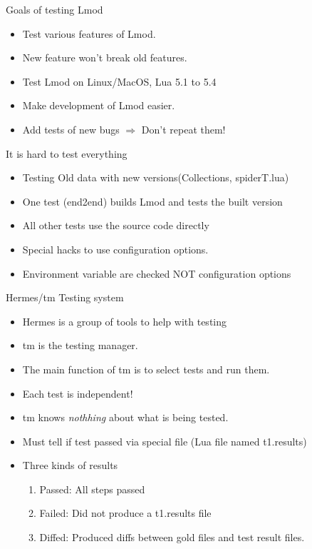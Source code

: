 \documentclass{beamer}
\begin{document}
\begin{frame}{Goals of testing Lmod}
  \begin{itemize}
    \item Test various features of Lmod.
    \item New feature won't break old features.
    \item Test Lmod on Linux/MacOS, Lua 5.1 to 5.4
    \item Make development of Lmod easier.
    \item Add tests of new bugs $\Rightarrow$ Don't repeat them!
  \end{itemize}
\end{frame}

\begin{frame}{It is hard to test everything}
  \begin{itemize}
    \item Testing Old data with new versions(Collections, spiderT.lua)
    \item One test (end2end) builds Lmod and tests the built version
    \item All other tests use the source code directly
    \item Special hacks to use configuration options. 
    \item Environment variable are checked NOT configuration options
  \end{itemize}
\end{frame}

\begin{frame}{Hermes/tm Testing system}
  \begin{itemize}
    \item Hermes is a group of tools to help with testing
    \item tm is the testing manager.
    \item The main function of tm is to select tests and run them.
    \item Each test is independent!
    \item tm knows \emph{nothhing} about what is being tested.
    \item Must tell if test passed via special file (Lua file named
      t1.results)
    \item Three kinds of results
      \begin{enumerate}
        \item Passed: All steps passed
        \item Failed: Did not produce a t1.results file
        \item Diffed: Produced diffs between gold files and test
          result files.
      \end{enumerate}
  \end{itemize}
\end{frame}
\end{document}
